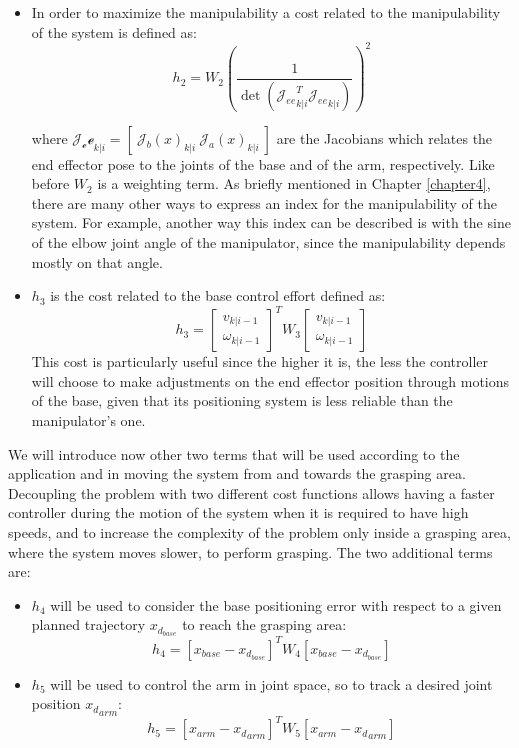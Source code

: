 \begin{itemize}
\item In order to maximize the manipulability a cost related to the manipulability of the system is defined as:
\begin{equation}
h_2 = W_2 \left( \frac{1}{\det({\mathcal{J}_{ee}}_{k|i}^T{\mathcal{J}_{ee}}_{k|i})} \right)^2
\end{equation}

where ${\mathcal{J_ee}}_{k|i}=[\ {\mathcal{J}_b(x)}_{k|i}\ {\mathcal{J}_a(x)}_{k|i}\ ]$ are the Jacobians which relates the end effector pose to the joints of the base and of the arm, respectively. Like before $W_2$ is a weighting term. As briefly mentioned in Chapter \ref{chapter4}, there are many other ways to express an index for the manipulability of the system. For example, another way this index can be described is with the sine of the elbow joint angle of the manipulator, since the manipulability depends mostly on that angle.
    
\item $h_3$ is the cost related to the base control effort defined as: 
	\begin{equation}
	        h_3=\left[ \begin{matrix} v_{k|i-1} \\ \omega_{k|i-1} \end{matrix}\right]^T W_3 \left[ \begin{matrix} v_{k|i-1} \\ \omega_{k|i-1} \end{matrix}\right]
	 \end{equation}
This cost is particularly useful since the higher it is, the less the controller will choose to make adjustments on the end effector position through motions of the base, given that its positioning system is less reliable than the manipulator's one.
\end{itemize}
We will introduce now other two terms that will be used according to the application and in moving the system from and towards the grasping area. Decoupling the problem with two different cost functions allows having a faster controller during the motion of the system when it is required to have high speeds, and to increase the complexity of the problem only inside a grasping area, where the system moves slower, to perform grasping. The two additional terms are:
\begin{itemize}
    \item $h_4$ will be used to consider the base positioning error with respect to a given planned trajectory $x_{d_{base}}$ to reach the grasping area:
        \begin{equation}
            h_4=[x_{base}-x_{d_{base}}]^T W_4 [x_{base}-x_{d_{base}}]
        \end{equation}
     \item $h_5$ will be used to control the arm in joint space, so to track a desired joint position ${x_d}_{arm}$:
    \begin{equation}
       h_5=[x_{arm}-{x_d}_{arm}]^T W_5 [x_{arm}-{x_d}_{arm}]
    \end{equation}
\end{itemize}
